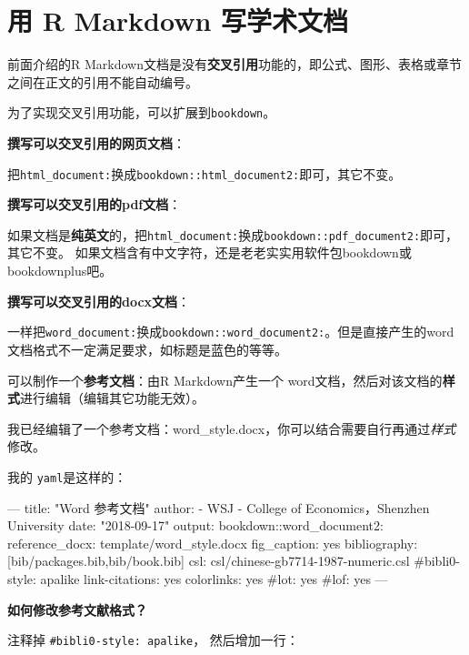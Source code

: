 \documentclass[]{article}
\newenvironment{Shaded}{\begin{snugshade}}{\end{snugshade}}
\newcommand{\BaseNTok}[1]{\textcolor[rgb]{0.00,0.00,0.81}{#1}}
\newcommand{\NormalTok}[1]{#1}
\begin{document}
\hypertarget{-r-markdown-}{%
\section{用 R Markdown 写学术文档}\label{-r-markdown-}}

前面介绍的R
Markdown文档是没有\textbf{交叉引用}功能的，即公式、图形、表格或章节之间在正文的引用不能自动编号。

为了实现交叉引用功能，可以扩展到\texttt{bookdown}。

\textbf{撰写可以交叉引用的网页文档}：

把\texttt{html\_document:}换成\texttt{bookdown::html\_document2:}即可，其它不变。

\textbf{撰写可以交叉引用的pdf文档}：

如果文档是\textbf{纯英文}的，把\texttt{html\_document:}换成\texttt{bookdown::pdf\_document2:}即可，其它不变。
如果文档含有中文字符，还是老老实实用软件包bookdown或bookdownplus吧。

\textbf{撰写可以交叉引用的docx文档}：

一样把\texttt{word\_document:}换成\texttt{bookdown::word\_document2:}。但是直接产生的word文档格式不一定满足要求，如标题是蓝色的等等。

可以制作一个\textbf{参考文档}：由R Markdown产生一个
word文档，然后对该文档的\textbf{样式}进行编辑（编辑其它功能无效）。

我已经编辑了一个参考文档：word\_style.docx，你可以结合需要自行再通过\emph{样式}修改。

我的 \texttt{yaml}是这样的：

\begin{Shaded}
\begin{Highlighting}[]
\NormalTok{---}
\NormalTok{title: "Word 参考文档"}
\NormalTok{author:}
\NormalTok{  - WSJ}
\NormalTok{  - College of Economics，Shenzhen University}
\NormalTok{date:  "2018-09-17"}
\NormalTok{output:}
\NormalTok{  bookdown::word_document2: }
\BaseNTok{    reference_docx: template/word_style.docx}
\BaseNTok{    fig_caption: yes}
\NormalTok{bibliography: [bib/packages.bib,bib/book.bib]}
\NormalTok{csl: csl/chinese-gb7714-1987-numeric.csl}
\NormalTok{#bibli0-style: apalike}
\NormalTok{link-citations: yes}
\NormalTok{colorlinks: yes}
\NormalTok{#lot: yes}
\NormalTok{#lof: yes}
\NormalTok{---}
\end{Highlighting}
\end{Shaded}

\textbf{如何修改参考文献格式？}

注释掉 \texttt{\#bibli0-style:\ apalike}， 然后增加一行：
\end{document}
